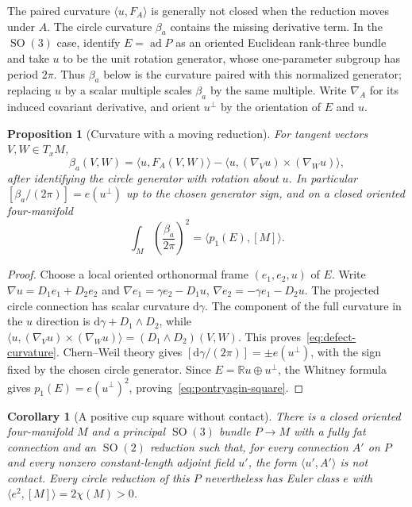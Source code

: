 \documentclass[11pt]{amsart}
\newcommand{\ad}{\operatorname{ad}}
\newcommand{\SO}{\operatorname{SO}}
\newcommand{\dd}{\mathrm d}
\theoremstyle{plain}
\newtheorem{proposition}[theorem]{Proposition}
\newtheorem{corollary}[theorem]{Corollary}
\theoremstyle{definition}
\theoremstyle{remark}
\begin{document}
The paired curvature $\langle u,F_A\rangle$ is generally not closed
when the reduction moves under $A$.  The circle curvature $\beta_a$
contains the missing derivative term.  In the $\SO(3)$ case, identify
$E=\ad P$ as an oriented Euclidean rank-three bundle and take $u$
to be the unit rotation generator, whose one-parameter subgroup has
period $2\pi$.  Thus $\beta_a$ below is the curvature paired with this
normalized generator; replacing $u$ by a scalar multiple scales
$\beta_a$ by the same multiple.  Write $\nabla_A$ for its induced covariant
derivative, and orient $u^\perp$ by the orientation of $E$ and $u$.

\begin{proposition}[Curvature with a moving reduction]\label{prop:defect}
For tangent vectors $V,W\in T_xM$,
\begin{equation}\label{eq:defect-curvature}
 \beta_a(V,W)=\langle u,F_A(V,W)\rangle
 -\langle u,(\nabla_Vu)\times(\nabla_Wu)\rangle,
\end{equation}
after identifying the circle generator with rotation about $u$.
In particular $[\beta_a/(2\pi)]=e(u^\perp)$ up to the chosen
generator sign, and on a closed oriented four-manifold
\begin{equation}\label{eq:pontryagin-square}
 \int_M\left(\frac{\beta_a}{2\pi}\right)^2
 =\langle p_1(E),[M]\rangle.
\end{equation}
\end{proposition}

\begin{proof}
Choose a local oriented orthonormal frame $(e_1,e_2,u)$ of $E$.
Write $\nabla u=D_1e_1+D_2e_2$ and
$\nabla e_1=\gamma e_2-D_1u$,
$\nabla e_2=-\gamma e_1-D_2u$.
The projected circle connection has scalar curvature $\dd\gamma$.
The component of the full curvature in the $u$ direction is
$\dd\gamma+D_1\wedge D_2$, while
$\langle u,(\nabla_Vu)\times(\nabla_Wu)\rangle
 =(D_1\wedge D_2)(V,W)$.
This proves~\eqref{eq:defect-curvature}.  Chern--Weil theory gives
$[\dd\gamma/(2\pi)]=\pm e(u^\perp)$, with the sign fixed by the
chosen circle generator.
Since $E=\mathbb Ru\oplus u^\perp$, the Whitney formula gives
$p_1(E)=e(u^\perp)^2$, proving~\eqref{eq:pontryagin-square}.
\end{proof}

\begin{corollary}[A positive cup square without contact]\label{cor:nosymplectic}
There is a closed oriented four-manifold $M$ and a principal
$\SO(3)$ bundle $P\to M$ with a fully fat connection and an
$\SO(2)$ reduction such that, for every connection $A'$ on $P$
and every nonzero constant-length adjoint field $u'$, the form
$\langle u',A'\rangle$ is not contact.  Every circle reduction of
this $P$ nevertheless has Euler class $e$ with
$\langle e^2,[M]\rangle=2\chi(M)>0$.
\end{corollary}
\end{document}
